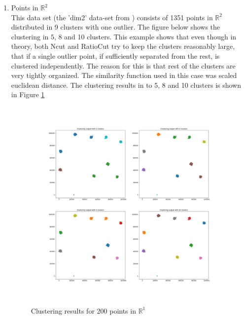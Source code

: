 \documentclass[10pt,a4paper, nocenter]{report}
\begin{document}
\begin{enumerate}
        \item{Points in $\mathbb{R}^2$}\\
        This data set (the 'dim2' data-set from \cite{DIMLow}) consists of 1351 points in $\mathbb{R}^2$ distributed in 9 clusters with one outlier. The figure below shows the clustering in 5, 8 and 10 clusters. This example shows that even though in theory, both Ncut and RatioCut try to keep the clusters reasonably large, that if a single outlier point, if sufficiently separated from the rest, is clustered independently. The reason for this is that rest of the clusters are very tightly organized. The similarity function used in this case was scaled euclidean distance. The clustering results in to 5, 8 and 10 clusters is shown in Figure \ref{fig:2dresults}
        \begin{figure}[h]
        \includegraphics[width=\textwidth]{../../2DCluster.jpg}
        \caption{Clustering results for 200 points in $\mathbb{R}^1$}
        \label{fig:2dresults}
        \end{figure}


\end{enumerate}
\end{document}
